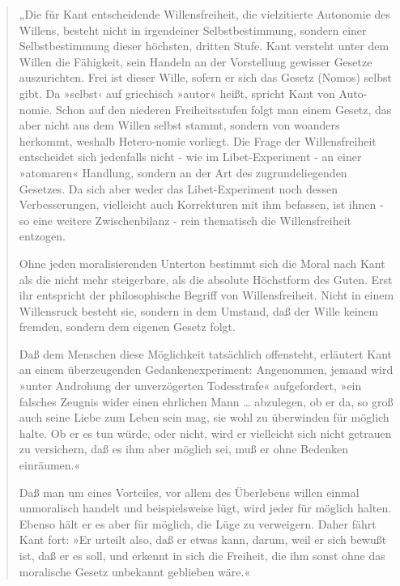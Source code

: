 \documentclass[
  a4paper,
]{report}
\begin{document}
\begin{quote}
„Die für Kant entscheidende Willensfreiheit, die vielzitierte Autonomie des Willens, besteht nicht in irgendeiner Selbstbestimmung, sondern einer Selbstbestimmung dieser höchsten, dritten Stufe. Kant versteht unter dem Willen die Fähigkeit, sein Handeln an der Vorstellung gewisser Gesetze auszurichten. Frei ist dieser Wille, sofern er sich das Gesetz (Nomos) selbst gibt. Da »selbst‹ auf griechisch »autor« heißt, spricht Kant von Auto-nomie. Schon auf den niederen Freiheitsstufen folgt man einem Gesetz, das aber nicht aus dem Willen selbst stammt, sondern von woanders herkommt, weshalb Hetero-nomie vorliegt. Die Frage der Willensfreiheit entscheidet sich jedenfalls nicht - wie im Libet-Experiment - an einer »atomaren« Handlung, sondern an der Art des zugrundeliegenden Gesetzes. Da sich aber weder das Libet-Experiment noch dessen Verbesserungen, vielleicht auch Korrekturen mit ihm befassen, ist ihnen - so eine weitere Zwischenbilanz - rein thematisch die Willensfreiheit entzogen.

Ohne jeden moralisierenden Unterton bestimmt sich die Moral nach Kant als die nicht mehr steigerbare, als die absolute Höchstform des Guten. Erst ihr entspricht der philosophische Begriff von Willensfreiheit. Nicht in einem Willensruck besteht sie, sondern in dem Umstand, daß der Wille keinem fremden, sondern dem eigenen Gesetz folgt.

Daß dem Menschen diese Möglichkeit tatsächlich offensteht, erläutert Kant an einem überzeugenden Gedankenexperiment: Angenommen, jemand wird »unter Androhung der unverzögerten Todesstrafe« aufgefordert, »ein falsches Zeugnis wider einen ehrlichen Mann \ldots{} abzulegen, ob er da, so groß auch seine Liebe zum Leben sein mag, sie wohl zu überwinden für möglich halte. Ob er es tun würde, oder nicht, wird er vielleicht sich nicht getrauen zu versichern, daß es ihm aber möglich sei, muß er ohne Bedenken einräumen.«

Daß man um eines Vorteiles, vor allem des Überlebens willen einmal unmoralisch handelt und beispielsweise lügt, wird jeder für möglich halten. Ebenso hält er es aber für möglich, die Lüge zu verweigern. Daher fährt Kant fort: »Er urteilt also, daß er etwas kann, darum, weil er sich bewußt ist, daß er es soll, und erkennt in sich die Freiheit, die ihm sonst ohne das moralische Gesetz unbekannt geblieben wäre.«


\end{quote}
\end{document}
